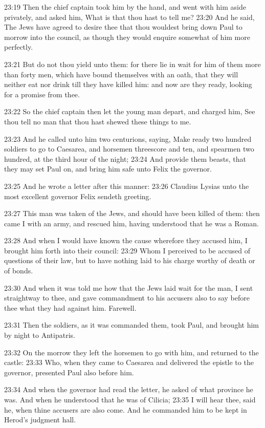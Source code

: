 23:19 Then the chief captain took him by the hand, and went with him
aside privately, and asked him, What is that thou hast to tell me?
23:20 And he said, The Jews have agreed to desire thee that thou
wouldest bring down Paul to morrow into the council, as though they
would enquire somewhat of him more perfectly.

23:21 But do not thou yield unto them: for there lie in wait for him
of them more than forty men, which have bound themselves with an oath,
that they will neither eat nor drink till they have killed him: and
now are they ready, looking for a promise from thee.

23:22 So the chief captain then let the young man depart, and charged
him, See thou tell no man that thou hast shewed these things to me.

23:23 And he called unto him two centurions, saying, Make ready two
hundred soldiers to go to Caesarea, and horsemen threescore and ten,
and spearmen two hundred, at the third hour of the night; 23:24 And
provide them beasts, that they may set Paul on, and bring him safe
unto Felix the governor.

23:25 And he wrote a letter after this manner: 23:26 Claudius Lysias
unto the most excellent governor Felix sendeth greeting.

23:27 This man was taken of the Jews, and should have been killed of
them: then came I with an army, and rescued him, having understood
that he was a Roman.

23:28 And when I would have known the cause wherefore they accused
him, I brought him forth into their council: 23:29 Whom I perceived to
be accused of questions of their law, but to have nothing laid to his
charge worthy of death or of bonds.

23:30 And when it was told me how that the Jews laid wait for the man,
I sent straightway to thee, and gave commandment to his accusers also
to say before thee what they had against him. Farewell.

23:31 Then the soldiers, as it was commanded them, took Paul, and
brought him by night to Antipatris.

23:32 On the morrow they left the horsemen to go with him, and
returned to the castle: 23:33 Who, when they came to Caesarea and
delivered the epistle to the governor, presented Paul also before him.

23:34 And when the governor had read the letter, he asked of what
province he was. And when he understood that he was of Cilicia; 23:35
I will hear thee, said he, when thine accusers are also come. And he
commanded him to be kept in Herod's judgment hall.

